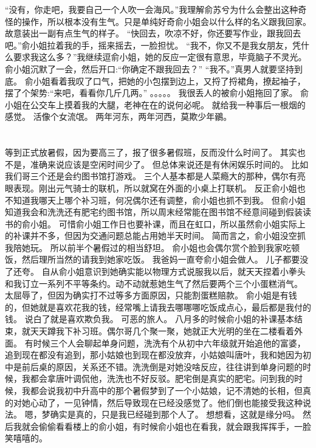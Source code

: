 “没有，你走吧，我要自己一个人吹一会海风。”我理解俞苏兮为什么会整出这种奇怪的操作，所以根本没有生气。只是单纯好奇俞小姐会以什么样的名义跟我回家。故意装出一副有点生气的样子。
“快回去，吹凉不好，你还要写作业，跟我回去吧。”俞小姐拉着我的手，摇来摇去，一脸担忧。
“我不，你又不是我女朋友，凭什么要求我这么多？”我继续逗俞小姐，她的反应一定很有意思，毕竟脑子不灵光。
俞小姐沉默了一会，然后开口:“你确定不跟我回去？”
“我不。”真男人就要坚持到底。
俞小姐看着我叹了口气，把她的小包摆到边上，又捋了捋裙角，撩起袖子，摆了个架势:“来吧，看看你几斤几两。”
。。。。。
我很丢人的被俞小姐拖回了家。
俞小姐在公交车上摸着我的大腿，老神在在的说何必呢。
就给我一种事后一根烟的感觉。
活像个女流氓。
两年河东，两年河西，莫欺少年鶸。

\chapter{}
等到正式放暑假，因为要高三了，报了很多暑假班，反而没什么时间了。
其实也不是，准确来说应该是空闲时间少了。
但总体来说还是有休闲娱乐时间的。
比如我们哥三个还是会约图书馆打游戏。
三个人基本都是人菜瘾大的那种，偶尔有亮眼表现。刚出元气骑士的联机，所以就窝在外面的小桌上打联机。
反正俞小姐也不知道我哪天上哪个补习班，何况偶尔还有调整，俞小姐也抓不到我。
但俞小姐知道我会和洗洗还有肥宅约图书馆，所以周末经常能在图书馆不经意间碰到假装读书的俞小姐。
可惜俞小姐工作日也要补课，而且在虹口，所以虽然俞小姐实际上的补课并不多，但因为交通问题总能占用她半天时间。
简而言之，俞小姐没空抓我陪她玩。
所以前半个暑假过的相当舒坦。
俞小姐也会偶尔赏个脸到我家吃顿饭，然后理所当然的请我到她家吃饭。
我爸妈一直夸俞小姐会做人。
儿子都要没了还夸。
自从俞小姐意识到她确实能以物理方式说服我以后，就天天捏着小拳头和我订立一系列不平等条约。动不动就惹她生气了然后要两个三个小蛋糕消气。
太屈辱了，但因为确实打不过等多方面原因，只能割蛋糕赔款。
俞小姐是有钱的，但她就是喜欢花我的钱，经常嘴上请我去哪哪哪吃饭成点心，最后都是我付的钱。
说白了就是喜欢欺负我。
可恶的旅人。
八月多的时候俞小姐的补课基本结束，就天天蹲我下补习班。偶尔哥几个聚一聚，她就正大光明的坐在二楼看着外面。
有时候三个人会聊起单身问题，洗洗有个从初中六年级就开始追他的富婆，追到现在都没有追到，那小姑娘也到现在都没放弃，小姑娘叫唐叶，我和她因为初中是前后桌的原因，关系还不错。洗洗倒是对她没啥反应，往往讲到单身问题的时候，我都会拿唐叶调侃他，洗洗也不好反驳。肥宅倒是真实的肥宅。问到我的时候，我都会说我初中升高中的那个暑假梦到了一个小姑娘，记不清她的长相，但真的对她心动了，一见钟情，然后导致现在已经没感觉了。他们倒也能接受我这种说法。
嗯，梦确实是真的，只是我已经碰到那个人了。
想想看，这就是缘分吗。
然后我就会偷偷看看楼上的俞小姐，有时候俞小姐也在看我，就会跟我挥挥手，一脸笑嘻嘻的。
